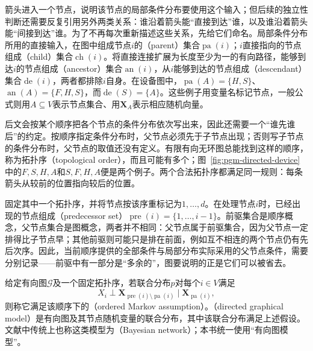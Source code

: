 箭头进入一个节点，说明该节点的局部条件分布要使用这个输入；但后续的独立性判断还需要反复引用另外两类关系：谁沿着箭头能“直接到达”谁，以及谁沿着箭头能“间接到达”谁。为了不再每次重新描述这些关系，先给它们命名。局部条件分布所用的直接输入，在图中组成节点$i$的（parent）集合$\operatorname{pa}(i)$；$i$直接指向的节点组成（child）集合$\operatorname{ch}(i)$。将直接连接扩展为长度至少为一的有向路径，能够到达$i$的节点组成（ancestor）集合$\operatorname{an}(i)$，从$i$能够到达的节点组成（descendant）集合$\operatorname{de}(i)$，两者都排除$i$自身。在设备图中，$\operatorname{pa}(A)=\{H,S\}$、$\operatorname{an}(A)=\{F,H,S\}$，而$\operatorname{de}(S)=\{A\}$。这些例子用变量名标记节点，一般公式则用$A\subseteq V$表示节点集合、用$\bm{X}_A$表示相应随机向量。

后文会按某个顺序把各个节点的条件分布依次写出来，因此还需要一个“谁先谁后”的约定。按顺序指定条件分布时，父节点必须先于子节点出现；否则写子节点的条件分布时，父节点的取值还没有定义。有限有向无环图总能找到这样的顺序，称为拓扑序（topological order），而且可能有多个；图~\ref{fig:pgm-directed-device}中的$F,S,H,A$和$S,F,H,A$便是两个例子。两个合法拓扑序都满足同一规则：每条箭头从较前的位置指向较后的位置。

固定其中一个拓扑序，并将节点按该序重标记为$1,\ldots,d$。在处理节点$i$时，已经出现的节点组成（predecessor set）$\operatorname{pre}(i)=\{1,\ldots,i-1\}$。前驱集合是顺序概念，父节点集合是图概念，两者并不相同：父节点属于前驱集合，因为父节点一定排得比子节点早；其他前驱则可能只是排在前面，例如互不相连的两个节点仍有先后次序。因此，当前顺序提供的全部条件与局部分布实际采用的父节点条件，需要分别记录——前驱中有一部分是“多余的”，图要说明的正是它们可以被省去。

\begin{definition}[有序Markov假设与有向图模型]
  \label{def:pgm-directed-ordered}
  给定有向图$\mathcal{G}$及一个固定拓扑序，若联合分布$p$对每个$i\in V$满足
  \begin{equation}
    X_i\perp
    \bm{X}_{\operatorname{pre}(i)\setminus\operatorname{pa}(i)}
    \mid\bm{X}_{\operatorname{pa}(i)},
    \label{eq:pgm-directed-ordered}
  \end{equation}
  则称它满足该顺序下的（ordered Markov assumption）。（directed graphical model）是有向图及其节点随机变量的联合分布，其中该联合分布满足上述假设。文献中传统上也称这类模型为（Bayesian network）；本书统一使用“有向图模型”。
\end{definition}

